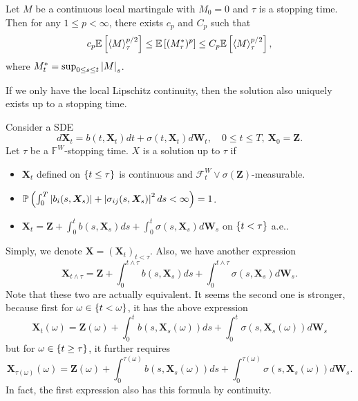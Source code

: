 \begin{thm}
    Let $M$ be a continuous local martingale with $M_0 = 0$ and $\tau$ is a stopping time. Then for any $1\leq p < \infty$, there exists $c_p$ and $C_p$ such that
    \begin{equation*}
        c_p\mathbb{E}\left[\left\langle M \right\rangle_\tau^{p/2}\right] \leq \mathbb{E}\left[(M^*_\tau)^p\right] \leq C_p\mathbb{E}\left[\left\langle M \right\rangle_\tau^{p/2}\right],
    \end{equation*}
    where $M^*_t = \sup_{0\leq s\leq t}\left\lvert M\right\lvert_s$.
\end{thm}

If we only have the local Lipschitz continuity, then the solution also uniquely exists up to a stopping time.
\begin{defn}
    Consider a SDE
    \begin{equation*}
        d\bm{X}_t = b(t,\bm{X}_t)dt+\sigma(t,\bm{X}_t)d\bm{W}_t,\quad 0\leq t \leq T,~\bm{X}_0 = \bm{Z}.
    \end{equation*}
    Let $\tau$ be a $\mathbb{F}^W$-stopping time. $X$ is a solution up to $\tau$ if
    \begin{itemize}
        \item $\bm{X}_t$ defined on $\left\{t \leq \tau\right\}$ is continuous and $\mathcal{F}^W_t \vee \sigma(\bm{Z})$-measurable.

        \item $\mathbb{P}\left(\int_0^T \left\lvert b_i(s,\bm{X}_s)\right\lvert + \left\lvert\sigma_{ij}(s,\bm{X}_s)\right\lvert^2 ds < \infty\right) = 1$.

        \item $\bm{X}_{t} = \bm{Z} + \int_0^{t}b(s,\bm{X}_s)ds+\int_0^{t}\sigma(s,\bm{X}_s)d\bm{W}_s$ on $\left\{t < \tau\right\}$ a.e..
    \end{itemize}
\end{defn}
\begin{rmk}
    Simply, we denote $\bm{X} = (\bm{X}_t)_{t < \tau}$. Also, we have another expression
    \begin{equation*}
        \bm{X}_{t \wedge \tau} = \bm{Z} + \int_0^{t \wedge \tau}b(s,\bm{X}_s)ds+\int_0^{t \wedge \tau}\sigma(s,\bm{X}_s)d\bm{W}_s.
    \end{equation*}
    Note that these two are actually equivalent. It seems the second one is stronger, because first for $\omega \in \left\{t < \omega\right\}$, it has the above expression
    \begin{equation*}
        \bm{X}_{t}(\omega) = \bm{Z}(\omega) + \int_0^{t}b(s,\bm{X}_s(\omega))ds+\int_0^{t}\sigma(s,\bm{X}_s(\omega))d\bm{W}_s
    \end{equation*}
    but for $\omega \in \left\{t \geq \tau\right\}$, it further requires
    \begin{equation*}
        \bm{X}_{\tau(\omega)}(\omega) = \bm{Z}(\omega) + \int_0^{\tau(\omega)}b(s,\bm{X}_s(\omega))ds+\int_0^{\tau(\omega)}\sigma(s,\bm{X}_s(\omega))d\bm{W}_s.
    \end{equation*}
    In fact, the first expression also has this formula by continuity.
\end{rmk}


